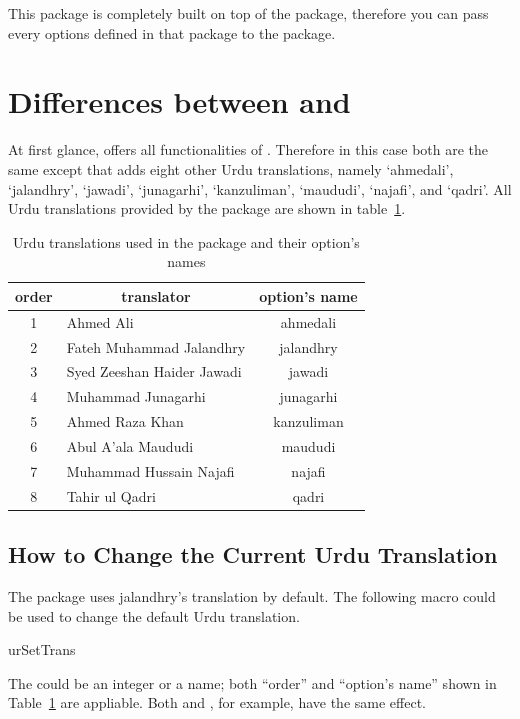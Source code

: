 \documentclass[a4paper]{ltxdoc}
\begin{document}
This package is completely built on top of the  package, therefore you can pass every options
defined in that package to the  package. 

\section{Differences between  and }
At first glance,   offers all functionalities of . Therefore in this case 
both are the same except that  adds eight other Urdu translations, namely 
`ahmedali', `jalandhry', `jawadi', `junagarhi', `kanzuliman', `maududi', `najafi', and `qadri'.
All Urdu translations provided by the package are shown in table~\ref{tab:urtrans}.

\begin{table}[!htbp]
\centering
\begin{tabular}{|c|l|c|}
    \toprule
    order & \multicolumn{1}{c|}{translator} & option's name \\\midrule
    1 & Ahmed Ali & ahmedali \\
    2 & Fateh Muhammad Jalandhry & jalandhry \\
    3 & Syed Zeeshan Haider Jawadi  & jawadi \\
    4 & Muhammad Junagarhi & junagarhi \\
    5 & Ahmed Raza Khan  &  kanzuliman \\
    6 & Abul A'ala Maududi &  maududi \\
    7 & Muhammad Hussain Najafi &  najafi \\
    8 & Tahir ul Qadri  &  qadri \\
    \bottomrule
\end{tabular}
    \caption{Urdu translations used in the package and their option's names}
    \label{tab:urtrans}
\end{table}

\subsection{How to Change the Current Urdu Translation}
    The  package uses jalandhry's translation by default. 
    The following macro could be used to change the default Urdu translation. 
    \begin{declcs}{urSetTrans}
    \end{declcs}    
    The  could be an integer or a name; both ``order'' and ``option's name'' 
    shown in Table~\ref{tab:urtrans} are appliable. Both  and , for example,
    have the same effect. 
    
\end{document}
